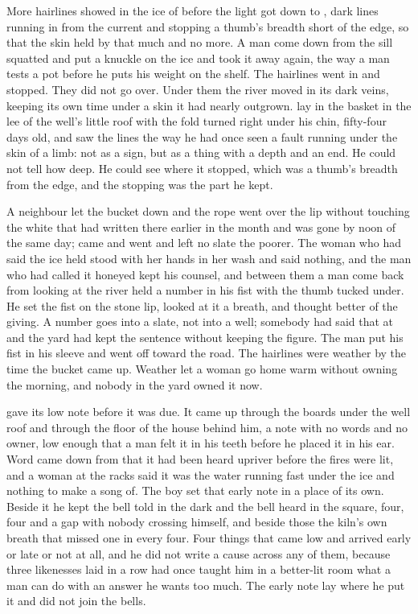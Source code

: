 
More hairlines showed in the ice of  before the light got down to , dark lines running in from the current and stopping a thumb's breadth short of the edge, so that the skin held by that much and no more. A man come down from the sill squatted and put a knuckle on the ice and took it away again, the way a man tests a pot before he puts his weight on the shelf. The hairlines went in and stopped. They did not go over. Under them the river moved in its dark veins, keeping its own time under a skin it had nearly outgrown.  lay in the basket in the lee of the well's little roof with the fold turned right under his chin, fifty-four days old, and saw the lines the way he had once seen a fault running under the skin of a limb: not as a sign, but as a thing with a depth and an end. He could not tell how deep. He could see where it stopped, which was a thumb's breadth from the edge, and the stopping was the part he kept.

A neighbour let the bucket down and the rope went over the lip without touching the white that had written there earlier in the month and was gone by noon of the same day;  came and went and left no slate the poorer. The woman who had said the ice held stood with her hands in her wash and said nothing, and the man who had called it honeyed kept his counsel, and between them a man come back from looking at the river held a number in his fist with the thumb tucked under. He set the fist on the stone lip, looked at it a breath, and thought better of the giving. A number goes into a slate, not into a well; somebody had said that at  and the yard had kept the sentence without keeping the figure. The man put his fist in his sleeve and went off toward the road. The hairlines were weather by the time the bucket came up. Weather let a woman go home warm without owning the morning, and nobody in the yard owned it now.

 gave its low note before it was due. It came up through the boards under the well roof and through the floor of the house behind him, a note with no words and no owner, low enough that a man felt it in his teeth before he placed it in his ear. Word came down from  that it had been heard upriver before the fires were lit, and a woman at the racks said it was the water running fast under the ice and nothing to make a song of. The boy set that early note in a place of its own. Beside it he kept the bell told in the dark and the bell heard in the square, four, four and a gap with nobody crossing himself, and beside those the kiln's own breath that missed one in every four. Four things that came low and arrived early or late or not at all, and he did not write a cause across any of them, because three likenesses laid in a row had once taught him in a better-lit room what a man can do with an answer he wants too much. The early note lay where he put it and did not join the bells.

